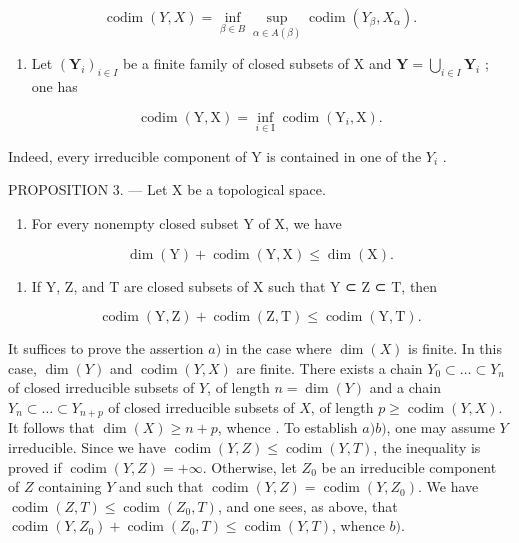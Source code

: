 \[
\operatorname{codim} (Y, X) = \inf _ {\beta \in B} \sup _ {\alpha \in A (\beta)} \operatorname{codim} (Y _ {\beta}, X _ {\alpha}).
\]

\begin{enumerate}
\def\labelenumi{\arabic{enumi})}
\setcounter{enumi}{3}
\tightlist
\item
  Let \((\mathbf{Y}_i)_{i\in I}\) be a finite family of closed subsets of X and \(\mathbf{Y} = \bigcup_{i\in I}\mathbf{Y}_i\) ; one has
\end{enumerate}

\[
\operatorname{codim} (\mathrm{Y}, \mathrm{X}) = \inf _ {i \in \mathrm{I}} \operatorname{codim} (\mathrm{Y} _ {i}, \mathrm{X}).
\]

Indeed, every irreducible component of Y is contained in one of the \(Y_{i}\) .

PROPOSITION 3. --- Let X be a topological space.

\begin{enumerate}
\def\labelenumi{\alph{enumi})}
\tightlist
\item
  For every nonempty closed subset Y of X, we have
\end{enumerate}

\[
\dim (\mathrm{Y}) + \operatorname{codim} (\mathrm{Y}, \mathrm{X}) \leqslant \dim (\mathrm{X}).
\]

\begin{enumerate}
\def\labelenumi{\alph{enumi})}
\setcounter{enumi}{1}
\tightlist
\item
  If Y, Z, and T are closed subsets of X such that Y ⊂ Z ⊂ T, then
\end{enumerate}

\[
\operatorname{codim} (\mathrm{Y}, \mathrm{Z}) + \operatorname{codim} (\mathrm{Z}, \mathrm{T}) \leqslant \operatorname{codim} (\mathrm{Y}, \mathrm{T}).
\]

It suffices to prove the assertion \(a)\) in the case where \(\dim(X)\) is finite. In this case, \(\dim(Y)\) and \(\operatorname{codim}(Y, X)\) are finite. There exists a chain \(Y_0 \subset \ldots \subset Y_n\) of closed irreducible subsets of \(Y\), of length \(n = \dim(Y)\) and a chain \(Y_n \subset \ldots \subset Y_{n+p}\) of closed irreducible subsets of \(X\), of length \(p \geqslant \operatorname{codim}(Y, X)\). It follows that \(\dim(X) \geqslant n + p\), whence . To establish \(a)\)\(b)\), one may assume \(Y\) irreducible. Since we have \(\operatorname{codim}(Y, Z) \leqslant \operatorname{codim}(Y, T)\), the inequality is proved if \(\operatorname{codim}(Y, Z) = +\infty\). Otherwise, let \(Z_0\) be an irreducible component of \(Z\) containing \(Y\) and such that \(\operatorname{codim}(Y, Z) = \operatorname{codim}(Y, Z_0)\). We have \(\operatorname{codim}(Z, T) \leqslant \operatorname{codim}(Z_0, T)\), and one sees, as above, that \(\operatorname{codim}(Y, Z_0) + \operatorname{codim}(Z_0, T) \leqslant \operatorname{codim}(Y, T)\), whence \(b)\).

